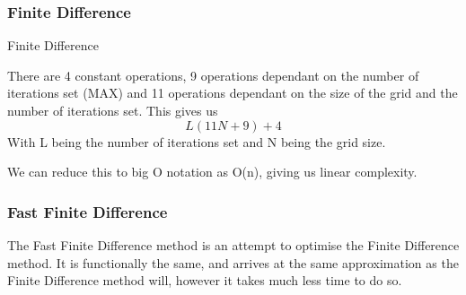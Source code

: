 \documentclass[aps,twocolumn,pre,nofootinbib,10pt]{revtex4-1}
\begin{document}
\subsubsection{Finite Difference}
\begin{algorithm}
    \caption{Finite Difference}
    \label{alg:fd}
    \begin{algorithmic}[1]
                    \EndIf
                    \EndIf
                \EndFor
            \EndFor
            \State {}
        \EndFunction
            \EndWhile
            \State {}
        \EndFunction
    \end{algorithmic}
\end{algorithm}

There are 4 constant operations, 9 operations dependant on the number of iterations set (MAX) and 11 operations dependant on the size of the grid and the number of iterations set. This gives us \[L(11N+9)+4\] With L being the number of iterations set and N being the grid size.

We can reduce this to big O notation as O(n), giving us linear complexity.

\subsubsection{Fast Finite Difference}

The Fast Finite Difference method is an attempt to optimise the Finite Difference method. It is functionally the same, and arrives at the same approximation as the Finite Difference method will, however it takes much less time to do so.
\end{document}
